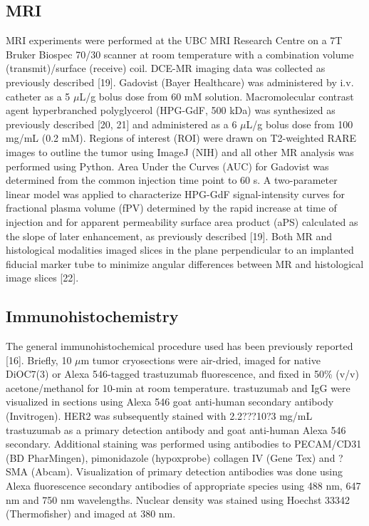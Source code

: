 \subsection{MRI}
MRI experiments were performed at the UBC MRI Research Centre on a 7T Bruker Biospec 70/30 scanner at room temperature with a combination volume (transmit)/surface (receive) coil.
DCE-MR imaging data was collected as previously described [19].
Gadovist (Bayer Healthcare) was administered by i.v.
catheter as a 5 $\mu$L/g bolus dose from 60 mM solution.
Macromolecular contrast agent hyperbranched polyglycerol (HPG-GdF, 500 kDa) was synthesized as previously described [20, 21] and administered as a 6 $\mu$L/g bolus dose from 100 mg/mL (0.2 mM).
Regions of interest (ROI) were drawn on T2-weighted RARE images to outline the tumor using ImageJ (NIH) and all other MR analysis was performed using Python.
Area Under the Curves (AUC) for Gadovist was determined from the common injection time point to 60 s.
A two-parameter linear model was applied to characterize HPG-GdF signal-intensity curves for fractional plasma volume (fPV) determined by the rapid increase at time of injection and for apparent permeability surface area product (aPS) calculated as the slope of later enhancement, as previously described [19].
Both MR and histological modalities imaged slices in the plane perpendicular to an implanted fiducial marker tube to minimize angular differences between MR and histological image slices [22].

\subsection{Immunohistochemistry}
The general immunohistochemical procedure used has been previously reported [16].
Briefly, 10 $\mu$m tumor cryosections were air-dried, imaged for native DiOC7(3) or Alexa 546-tagged trastuzumab fluorescence, and fixed in 50\% (v/v) acetone/methanol for 10-min at room temperature.
trastuzumab and IgG were visualized in sections using Alexa 546 goat anti-human secondary antibody (Invitrogen).
HER2 was subsequently stained with 2.2???10?3 mg/mL trastuzumab as a primary detection antibody and goat anti-human Alexa 546 secondary.
Additional staining was performed using antibodies to PECAM/CD31 (BD PharMingen), pimonidazole (hypoxprobe) collagen IV (Gene Tex) and ?SMA (Abcam).
Visualization of primary detection antibodies was done using Alexa fluorescence secondary antibodies of appropriate species using 488 nm, 647 nm and 750 nm wavelengths.
Nuclear density was stained using Hoechst 33342 (Thermofisher) and imaged at 380 nm.

